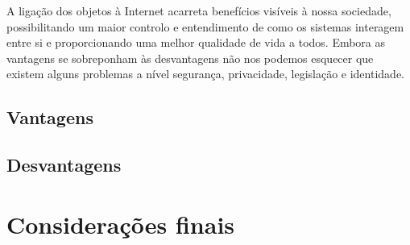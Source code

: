 A ligação dos objetos à Internet acarreta benefícios visíveis à nossa sociedade, possibilitando um maior controlo e entendimento de como os sistemas interagem entre si e proporcionando uma melhor qualidade de vida a todos. Embora as vantagens se sobreponham às desvantagens não nos podemos esquecer que existem alguns problemas a nível segurança, privacidade, legislação e identidade.



\subsection{Vantagens}

\subsection{Desvantagens}





\section{Considerações finais}






